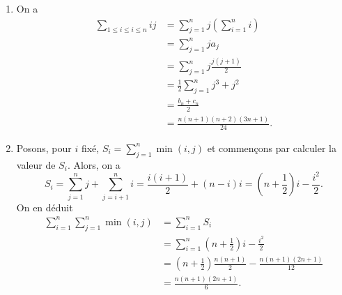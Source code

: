 \begin{enumerate}
	\item On a
	\[
		\begin{aligned}
			\sum_{1\leqslant i \leqslant i \leqslant n} ij 
			&= \sum_{j=1}^n j\left(\sum_{i = 1}^n i\right) \\
			&=  \sum_{j=1}^n ja_j \\
			&=  \sum_{j=1}^n j\frac{j(j+1)}{2} \\
			&= \frac 12 \sum_{j=1}^n j^3 +j^2 \\
			&= \frac{b_n+c_n}{2}\\
			&= \frac{n(n+1)(n+2)(3n+1)}{24}.
		\end{aligned}
	\]
	 \item Posons, pour $i$ fixé, $S_i = \sum_{j=1}^n \min(i,j)$ et commençons par calculer la valeur de $S_i$. Alors, on a
	 \[ S_i = \sum_{j=1}^n j + \sum_{j=i+1}^n i = \frac{i(i+1)}{2} + (n-i)i = \left( n + \frac{1}{2} \right)i - \frac{i^2}{2}.\]
	 On en déduit
	\[
		\begin{aligned}
			 \sum_{i=1}^n \sum_{j=1}^n \min(i,j)
			&= \sum_{i=1}^n S_i \\
			&=  \sum_{i=1}^n \left( n + \frac{1}{2} \right)i - \frac{i^2}{2} \\
			&=  \left( n + \frac{1}{2} \right)\frac{n(n+1)}{2} - \frac{n(n+1)(2n+1)}{12} \\
			&= \frac{n(n+1)(2n+1)}{6}.
		\end{aligned}
	\]
\end{enumerate}